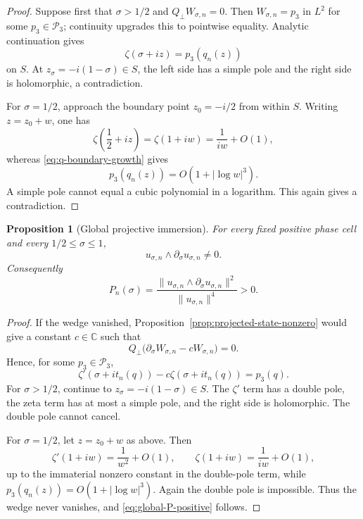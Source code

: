 \documentclass[11pt]{amsart}
\numberwithin{equation}{section}
\newtheorem{proposition}[theorem]{Proposition}
\newcommand{\C}{\mathbb C}
\begin{document}
\begin{proof}
Suppose first that $\sigma>1/2$ and $Q_\perp W_{\sigma,n}=0$.  Then
$W_{\sigma,n}=p_3$ in $L^2$ for some $p_3\in\mathcal P_3$; continuity
upgrades this to pointwise equality.  Analytic continuation gives
\[
\zeta(\sigma+iz)=p_3(q_n(z))
\]
on $S$.  At $z_\sigma=-i(1-\sigma)\in S$, the left side has a simple
pole and the right side is holomorphic, a contradiction.

For $\sigma=1/2$, approach the boundary point $z_0=-i/2$ from within
$S$.  Writing $z=z_0+w$, one has
\[
\zeta\!\left(\frac12+iz\right)
=\zeta(1+iw)=\frac{1}{iw}+O(1),
\]
whereas \eqref{eq:q-boundary-growth} gives
\[
p_3(q_n(z))=O\!\left(1+|\log w|^3\right).
\]
A simple pole cannot equal a cubic polynomial in a logarithm.  This
again gives a contradiction.
\end{proof}

\begin{proposition}[Global projective immersion]
\label{prop:global-projective-immersion}
For every fixed positive phase cell and every $1/2\le\sigma\le1$,
\begin{equation}
\boxed{
u_{\sigma,n}\wedge \partial_\sigma u_{\sigma,n}\ne0.
}
\label{eq:global-projective-immersion}
\end{equation}
Consequently
\begin{equation}
\boxed{
P_n(\sigma)
=\frac{\|u_{\sigma,n}\wedge\partial_\sigma u_{\sigma,n}\|^2}
{\|u_{\sigma,n}\|^4}>0.
}
\label{eq:global-P-positive}
\end{equation}
\end{proposition}

\begin{proof}
If the wedge vanished, Proposition~\ref{prop:projected-state-nonzero}
would give a constant $c\in\C$ such that
\[
Q_\perp\bigl(\partial_\sigma W_{\sigma,n}-cW_{\sigma,n}\bigr)=0.
\]
Hence, for some $p_3\in\mathcal P_3$,
\begin{equation}
\zeta'(\sigma+i t_n(q))-c\zeta(\sigma+i t_n(q))=p_3(q).
\label{eq:stationary-pole-identity}
\end{equation}
For $\sigma>1/2$, continue to $z_\sigma=-i(1-\sigma)\in S$.  The
$\zeta'$ term has a double pole, the zeta term has at most a simple pole,
and the right side is holomorphic.  The double pole cannot cancel.

For $\sigma=1/2$, let $z=z_0+w$ as above.  Then
\[
\zeta'(1+iw)=\frac{1}{w^2}+O(1),
\qquad
\zeta(1+iw)=\frac{1}{iw}+O(1),
\]
up to the immaterial nonzero constant in the double-pole term, while
$p_3(q_n(z))=O(1+|\log w|^3)$.  Again the double pole is impossible.
Thus the wedge never vanishes, and \eqref{eq:global-P-positive} follows.
\end{proof}
\end{document}
